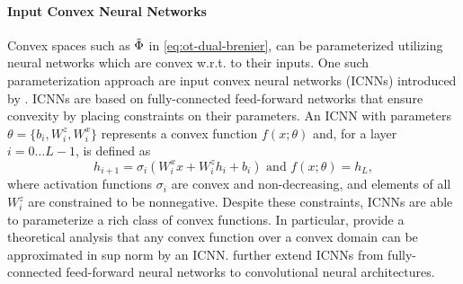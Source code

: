 \paragraph{Input Convex Neural Networks}
Convex spaces such as $\Tilde{\Phi}$ in \eqref{eq:ot-dual-brenier}, can be parameterized utilizing neural networks which are convex w.r.t. to their inputs. One such parameterization approach are input convex neural networks (ICNNs) introduced by \citet{amos2017}.
ICNNs are based on fully-connected feed-forward networks that ensure convexity by placing constraints on their parameters.
An ICNN with parameters $\theta = \{b_i, W^z_i, W^x_i\}$ represents a convex function $f(x; \theta)$ and, for a layer $i = {0 \ldots L-1}$, is defined as
\begin{equation}
    h_{i+1} = \sigma_i(W^x_ix + W^z_i h_i + b_i)  \text { and } f(x; \theta) = h_L,
\end{equation}
where activation functions $\sigma_i$ are convex and non-decreasing, and elements of all $W^z_i$ are constrained to be nonnegative.
Despite these constraints, ICNNs are able to parameterize a rich class of convex functions.
In particular, \citet{chen2020} provide a theoretical analysis that any convex function over a convex domain can be approximated in sup norm by an ICNN.
\citet{huang2021} further extend ICNNs from fully-connected feed-forward neural networks to convolutional neural architectures.

